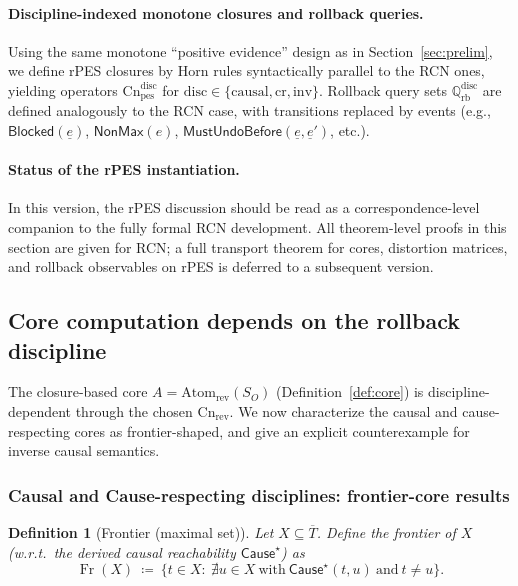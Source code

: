 \documentclass[twoside]{article}
\DeclareMathOperator{\Fr}{Fr}
\newtheorem{definition}[theorem]{Definition}
\newcommand{\Cn}{\mathrm{Cn}}
\newcommand{\Atom}{\mathrm{Atom}}
\newcommand{\1}{\mathbf{1}}
\begin{document}
\paragraph{Discipline-indexed monotone closures and rollback queries.}
Using the same monotone ``positive evidence'' design as in Section~\ref{sec:prelim}, we define rPES closures by Horn rules
syntactically parallel to the RCN ones, yielding operators \(\Cn^{\mathrm{disc}}_{\mathrm{pes}}\) for
\(\mathrm{disc}\in\{\mathrm{causal},\mathrm{cr},\mathrm{inv}\}\).
Rollback query sets \(\mathbb Q^{\mathrm{disc}}_{\mathrm{rb}}\) are defined analogously to the RCN case, with transitions replaced by events
(e.g., \(\mathsf{Blocked}(\underline{e})\), \(\mathsf{NonMax}(e)\), \(\mathsf{MustUndoBefore}(\underline{e},\underline{e}')\), etc.).

\paragraph{Status of the rPES instantiation.}
In this version, the rPES discussion should be read as a correspondence-level companion to the fully formal RCN development.
All theorem-level proofs in this section are given for RCN; a full transport theorem for cores, distortion matrices, and rollback observables on rPES is deferred to a subsequent version.

\subsection{Core computation depends on the rollback discipline}
\label{sec:rcn-core-by-discipline}

The closure-based core \(A=\Atom_{\mathrm{rev}}(S_O)\) (Definition~\ref{def:core}) is discipline-dependent through the chosen
\(\Cn_{\mathrm{rev}}\).
We now characterize the causal and cause-respecting cores as frontier-shaped, and give an explicit
counterexample for inverse causal semantics.

\subsubsection{Causal and Cause-respecting disciplines: frontier-core results}
\label{sec:rcn-frontier-core}

\begin{definition}[Frontier (maximal set)]
Let \(X\subseteq\overline{T}\). Define the frontier of \(X\) (w.r.t.\ the derived causal reachability \(\mathsf{Cause}^\star\)) as
\[
\Fr(X)\ \coloneqq\ \{t\in X:\ \nexists u\in X\ \text{with}\ \mathsf{Cause}^\star(t,u)\ \text{and}\ t\neq u\}.
\]
\end{definition}
\end{document}
